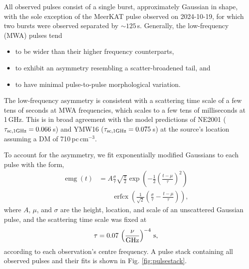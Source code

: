 \documentclass[preprint2,linenumbers]{aastex631}
\DeclareMathOperator{\erfcx}{erfcx}
\DeclareMathOperator{\emg}{emg}
\begin{document}
All observed pulses consist of a single burst, approximately Gaussian in shape, with the sole exception of the MeerKAT pulse observed on 2024-10-19, for which two bursts were observed separated by ${\sim}125\,$s.
Generally, the low-frequency (MWA) pulses tend
\begin{itemize}
    \item to be wider than their higher frequency counterparts,
    \item to exhibit an asymmetry resembling a scatter-broadened tail, and
    \item to have minimal pulse-to-pulse morphological variation.
\end{itemize}

The low-frequency asymmetry is consistent with a scattering time scale of a few tens of seconds at MWA frequencies, which scales to a few tens of milliseconds at 1\,GHz.
This is in broad agreement with the model predictions of NE2001 ($\tau_{\rm sc,1GHz} = 0.066\,$s) and YMW16 ($\tau_{\rm sc,1 GHz} = 0.075\,$s) at the source's location assuming a DM of 710\,pc\,cm$^{-3}$.

To account for the asymmetry, we fit exponentially modified Gaussians to each pulse with the form,
\begin{equation}
  \begin{aligned}
        \emg(t) &= A \frac{\sigma}{\tau}\sqrt{\frac{\pi}{2}}
                   \exp\left(-\frac12 \left( \frac{t - \mu}{\tau} \right)^2 \right) \\
                            &\qquad \erfcx \left(\frac{1}{\sqrt{2}} \left(\frac{\sigma}{\tau}
                             - \frac{t - \mu}{\tau} \right) \right),
  \end{aligned}
  \label{eqn:emg}
\end{equation}
where $A$, $\mu$, and $\sigma$ are the height, location, and scale of an unscattered Gaussian pulse, and the scattering time scale was fixed at
\begin{equation}
      \tau = 0.07\, \left(\frac{\nu}{\rm GHz}\right)^{-4} \, {\rm s},
\end{equation}
according to each observation's centre frequency.
A pulse stack containing all observed pulses and their fits is shown in Fig. \ref{fig:pulsestack}.
\end{document}
